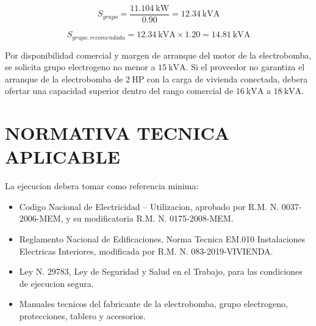 \documentclass[12pt,letterpaper]{report}
\begin{document}
\begin{equation}
S_{grupo}=\frac{11.104\ \text{kW}}{0.90}=12.34\ \text{kVA}
\end{equation}

\begin{equation}
S_{grupo,recomendada}=12.34\ \text{kVA}\times1.20=14.81\ \text{kVA}
\end{equation}

Por disponibilidad comercial y margen de arranque del motor de la electrobomba, se solicita grupo electrogeno no menor a \(15\ \text{kVA}\). Si el proveedor no garantiza el arranque de la electrobomba de \(2\ \text{HP}\) con la carga de vivienda conectada, debera ofertar una capacidad superior dentro del rango comercial de \(16\ \text{kVA}\) a \(18\ \text{kVA}\).

\section{NORMATIVA TECNICA APLICABLE}

La ejecucion debera tomar como referencia minima:

\begin{itemize}
  \item Codigo Nacional de Electricidad -- Utilizacion, aprobado por R.M. N. 0037-2006-MEM, y su modificatoria R.M. N. 0175-2008-MEM.
  \item Reglamento Nacional de Edificaciones, Norma Tecnica EM.010 Instalaciones Electricas Interiores, modificada por R.M. N. 083-2019-VIVIENDA.
  \item Ley N. 29783, Ley de Seguridad y Salud en el Trabajo, para las condiciones de ejecucion segura.
  \item Manuales tecnicos del fabricante de la electrobomba, grupo electrogeno, protecciones, tablero y accesorios.
\end{itemize}
\end{document}
